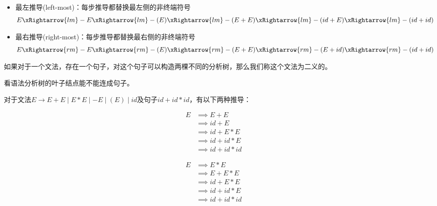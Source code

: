 \begin{itemize}
	\item 最左推导(left-most)：每步推导都替换最左侧的非终端符号
	\[E\xRightarrow{lm}
	-E\xRightarrow{lm}
	-(E)\xRightarrow{lm}
	-(E+E)\xRightarrow{lm}
	-(id+E)\xRightarrow{lm}
	-(id+id)\]
	\item 最右推导(right-most)：每步推导都替换最右侧的非终端符号
	\[E\xRightarrow{rm}
	-E\xRightarrow{rm}
	-(E)\xRightarrow{rm}
	-(E+E)\xRightarrow{rm}
	-(E+id)\xRightarrow{rm}
	-(id+id)\]
\end{itemize}

\begin{definition}[二义性]
如果对于一个文法，存在一个句子，对这个句子可以构造两棵不同的分析树，那么我们称这个文法为二义的。
\end{definition}
看语法分析树的叶子结点能不能连成句子。

\begin{example}
对于文法$E\to E+E\mid E*E\mid -E\mid (E)\mid id$及句子$id+id*id$，有以下两种推导：

\begin{minipage}{0.5\linewidth}
\[\begin{aligned}
E &\implies E+E\\
&\implies id+E\\
&\implies id+E*E\\
&\implies id+id*E\\
&\implies id+id*id
\end{aligned}\]
\end{minipage}
\begin{minipage}{0.5\linewidth}
\[\begin{aligned}
E &\implies E*E\\
&\implies E+E*E\\
&\implies id+E*E\\
&\implies id+id*E\\
&\implies id+id*id
\end{aligned}\]
\end{minipage}
\end{example}

